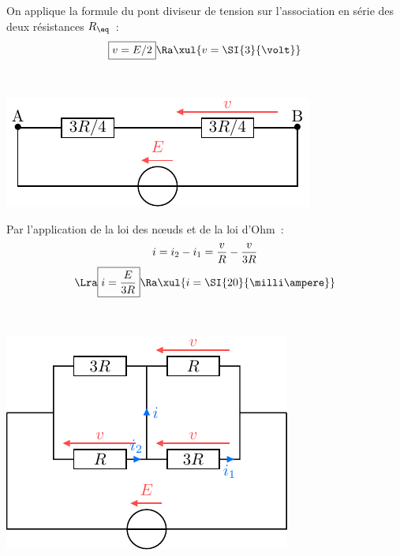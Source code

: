 \documentclass[a4paper, 10pt, garamond, oneside]{book}
\begin{document}
{\begin{enumerate}
\begin{minipage}[t]{0.55\linewidth}
		        On applique la formule du pont diviseur de tension sur l'association
		        en série des deux résistances $R_{\eq}$~:
            \[
              \boxed{v = E/2}
              \Ra
              \xul{v=\SI{3}{\volt}}
            \]
		      \end{minipage}
          \hfill
		      \begin{minipage}[t]{0.4\linewidth}
            ~
            \vspace{-30pt}
			      \begin{center}
		          \includegraphics[width=\linewidth]{diplin_q4}
			      \end{center}
		      \end{minipage}
          \vspace{30pt}
     \noindent
		      \begin{minipage}[t]{0.55\linewidth}
			      Par l'application de la loi des nœuds et de la loi d'Ohm~:
            \begin{gather*}
              i=i_2-i_1=\frac{v}{R}-\frac{v}{3R}
              \\\Lra
              \boxed{i = \frac{E}{3R}}
              \Ra 
              \xul{i = \SI{20}{\milli\ampere}}
            \end{gather*}
		      \end{minipage}
          \hfill
		      \begin{minipage}[t]{0.4\linewidth}
            ~
            \vspace{-60pt}
			      \begin{center}
		          \includegraphics[width=\linewidth]{diplin_q5}
			      \end{center}
		      \end{minipage}
	\end{enumerate}
}
\end{document}
